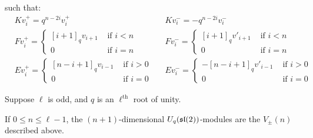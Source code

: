 such that: 
\begin{align*}
    &K v^+_i = q^{n-2i} v^+_i  &
    &K v^-_i = -q^{n-2i} v^-_i \\
    &F v^+_i = \begin{cases} [i+1]_qv_{i+1}& \text{ if $i < n$} \\ 0& \text{ if $i = n$} \end{cases} &
    &F v^-_i = \begin{cases} [i+1]_qv'_{i+1}& \text{ if $i < n$} \\ 0& \text{ if $i = n$} \end{cases} \\
    &E v^+_i = \begin{cases} 
                     [n-i+1]_qv_{i-1}& \text{ if $i > 0$} \\ 
                    0& \text{ if $i = 0$} 
             \end{cases} &
    &E v^-_i = \begin{cases} 
                    -[n-i+1]_q v'_{i-1}& \text{ if $i > 0$} \\ 
                    0& \text{ if $i = 0$} 
             \end{cases}
\end{align*}


Suppose $\ell$ is odd, and $q$ is an $\ell^{\text{th}}$ root of unity. 

If $0 \leq n \leq \ell - 1$, the $(n+1)$-dimensional
$U_q(\mathfrak{sl}(2))$-modules are the $V_{\pm}(n)$ described above. 

